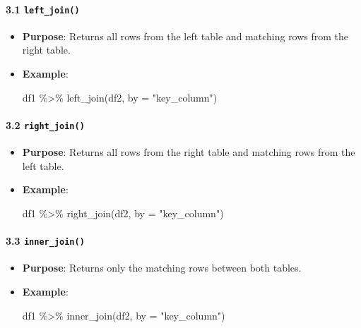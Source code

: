 \documentclass[
  letterpaper,
  DIV=11,
  numbers=noendperiod]{scrartcl}
\let\oldparagraph\paragraph
\renewcommand{\paragraph}[1]{\oldparagraph{#1}\mbox{}}
\newenvironment{Shaded}{\begin{snugshade}}{\end{snugshade}}
\newcommand{\AttributeTok}[1]{\textcolor[rgb]{0.40,0.45,0.13}{#1}}
\newcommand{\FunctionTok}[1]{\textcolor[rgb]{0.28,0.35,0.67}{#1}}
\newcommand{\NormalTok}[1]{\textcolor[rgb]{0.00,0.23,0.31}{#1}}
\newcommand{\SpecialCharTok}[1]{\textcolor[rgb]{0.37,0.37,0.37}{#1}}
\newcommand{\StringTok}[1]{\textcolor[rgb]{0.13,0.47,0.30}{#1}}
\begin{document}
\paragraph{\texorpdfstring{\textbf{3.1
\texttt{left\_join()}}}{3.1 left\_join()}}\label{left_join}

\begin{itemize}
\item
  \textbf{Purpose}: Returns all rows from the left table and matching
  rows from the right table.
\item
  \textbf{Example}:

\begin{Shaded}
\begin{Highlighting}[]
\NormalTok{df1 }\SpecialCharTok{\%\textgreater{}\%} \FunctionTok{left\_join}\NormalTok{(df2, }\AttributeTok{by =} \StringTok{"key\_column"}\NormalTok{)}
\end{Highlighting}
\end{Shaded}
\end{itemize}

\paragraph{\texorpdfstring{\textbf{3.2
\texttt{right\_join()}}}{3.2 right\_join()}}\label{right_join}

\begin{itemize}
\item
  \textbf{Purpose}: Returns all rows from the right table and matching
  rows from the left table.
\item
  \textbf{Example}:

\begin{Shaded}
\begin{Highlighting}[]
\NormalTok{df1 }\SpecialCharTok{\%\textgreater{}\%} \FunctionTok{right\_join}\NormalTok{(df2, }\AttributeTok{by =} \StringTok{"key\_column"}\NormalTok{)}
\end{Highlighting}
\end{Shaded}
\end{itemize}

\paragraph{\texorpdfstring{\textbf{3.3
\texttt{inner\_join()}}}{3.3 inner\_join()}}\label{inner_join}

\begin{itemize}
\item
  \textbf{Purpose}: Returns only the matching rows between both tables.
\item
  \textbf{Example}:

\begin{Shaded}
\begin{Highlighting}[]
\NormalTok{df1 }\SpecialCharTok{\%\textgreater{}\%} \FunctionTok{inner\_join}\NormalTok{(df2, }\AttributeTok{by =} \StringTok{"key\_column"}\NormalTok{)}
\end{Highlighting}
\end{Shaded}
\end{itemize}
\end{document}
